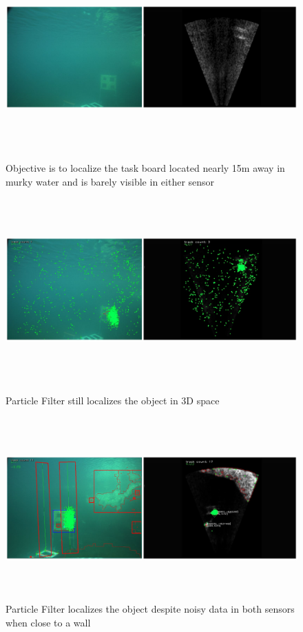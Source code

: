 \documentclass[15pt]{article}
\begin{document}
\begin{figure}
  \includegraphics[width=\textwidth,height=7cm]{pfsem1}
  \caption{Objective is to localize the task board located nearly 15m away in murky water and is barely visible in either sensor}
  \includegraphics[width=\textwidth,height=7cm]{pfsem2}
  \caption{Particle Filter still localizes the object in 3D space}
  \includegraphics[width=\textwidth,height=7cm]{pfsem3}
  \captionsetup{font=small,skip=-10pt,justification=centering}
  \caption{Particle Filter localizes the object despite noisy data in both sensors when close to a wall}
\end{figure}
\end{document}
